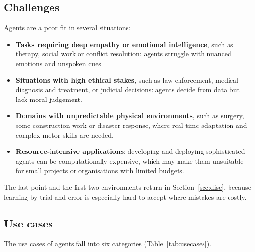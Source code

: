 \documentclass[11pt, a4paper]{article}
\begin{document}
\subsection{Challenges}

Agents are a poor fit in several situations:
\begin{itemize}
    \item \textbf{Tasks requiring deep empathy or emotional intelligence}, such as therapy, social work or conflict resolution: agents struggle with nuanced emotions and unspoken cues.
    \item \textbf{Situations with high ethical stakes}, such as law enforcement, medical diagnosis and treatment, or judicial decisions: agents decide from data but lack moral judgement.
    \item \textbf{Domains with unpredictable physical environments}, such as surgery, some construction work or disaster response, where real-time adaptation and complex motor skills are needed.
    \item \textbf{Resource-intensive applications}: developing and deploying sophisticated agents can be computationally expensive, which may make them unsuitable for small projects or organisations with limited budgets.
\end{itemize}
The last point and the first two environments return in Section~\ref{sec:disc}, because learning by trial and error is especially hard to accept where mistakes are costly.

\subsection{Use cases}

The use cases of agents fall into six categories (Table~\ref{tab:usecases}).
\end{document}
